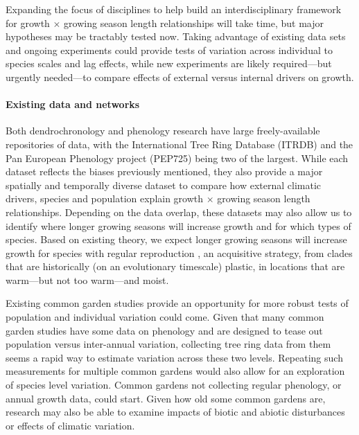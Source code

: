 \documentclass[11pt]{article}
\begin{document}
Expanding the focus of disciplines to help build an interdisciplinary framework for growth $\times$ growing season length relationships will take time, but major hypotheses may be tractably tested now. Taking advantage of existing data sets and ongoing experiments could provide tests of variation across individual to species scales and lag effects, while new experiments are likely required---but urgently needed---to compare effects of external versus internal drivers on growth. 

\paragraph{Existing data and networks}

Both dendrochronology and phenology research have large freely-available repositories of data, with the International Tree Ring Database (ITRDB) and the Pan European Phenology project (PEP725) being two of the largest. While each dataset reflects the biases previously mentioned, they also provide a major spatially and temporally diverse dataset to compare how external climatic drivers, species and population explain growth $\times$ growing season length relationships. Depending on the data overlap, these datasets may also allow us to identify  where longer growing seasons will increase growth and for which types of species. Based on existing theory, we expect longer growing seasons will increase growth for species with regular reproduction \citep[no masting, see also new masting database in][]{hacket2022mastree+}, an acquisitive strategy, from clades that are historically (on an evolutionary timescale) plastic, in locations that are warm---but not too warm---and moist.%

Existing common garden studies provide an opportunity for more robust tests of population and individual variation could come. Given that many common garden studies have some data on phenology and are designed to tease out population versus inter-annual variation, collecting tree ring data from them seems a rapid way to estimate variation across these two levels. Repeating such measurements for multiple common gardens would also allow for an exploration of species level variation. Common gardens not collecting regular phenology, or annual growth data, could start. Given how old some common gardens are, research may also be able to examine impacts of biotic and abiotic disturbances or effects of climatic variation. 
\end{document}
